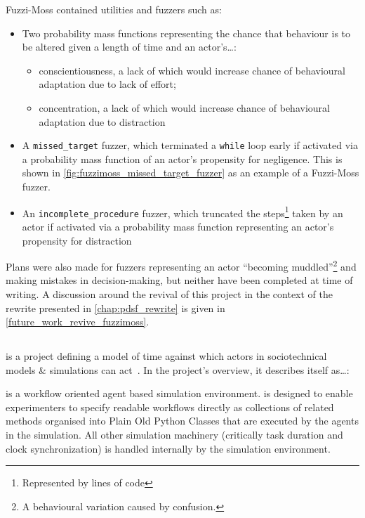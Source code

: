 Fuzzi-Moss contained utilities and fuzzers such as:

\begin{itemize}
    \item Two probability mass functions representing the chance that
    behaviour is to be altered given a length of time and an actor's\ldots{}:
    \begin{itemize}
        \item conscientiousness, a lack of which would increase chance of behavioural adaptation due to lack
    of effort;
        \item concentration, a lack of which would increase chance of behavioural
    adaptation due to distraction
    \end{itemize}
    \item A \lstinline{missed_target} fuzzer, which terminated a
    \lstinline{while} loop early if activated via a probability mass function of
    an actor's propensity for negligence. This is shown in
    \cref{fig:fuzzimoss_missed_target_fuzzer} as an example of a Fuzzi-Moss
    fuzzer.
    \item An \lstinline{incomplete_procedure} fuzzer, which truncated the
    steps\footnote{Represented by lines of code} taken by an actor if activated
    via a probability mass function representing an actor's propensity for
    distraction
\end{itemize}

Plans were also made for fuzzers representing an actor ``becoming
muddled''\footnote{A behavioural variation caused by confusion.} and making
mistakes in decision-making, but neither have been completed at time of writing.
A discussion around the revival of this project in the context of the \pdsf
rewrite presented in \cref{chap:pdsf_rewrite} is given in
\cref{future_work_revive_fuzzimoss}. 


\subsection{\theatreag{}}\label{subsec:prior_work_theatre}

\theatreag{} is a project defining a model of time against which actors in
sociotechnical models \& simulations can act~\cite{theatre_ag_repo}. In the
project's overview, it describes itself as\ldots{}:

\begin{blockquote}
    \theatreag{} is a workflow oriented agent based simulation environment.
    \theatreag{} is designed to enable experimenters to specify readable workflows
directly as collections of related methods organised into Plain Old Python
Classes that are executed by the agents in the simulation. All other simulation
machinery (critically task duration and clock synchronization) is handled
internally by the simulation environment.
\end{blockquote}

